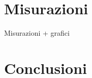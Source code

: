 \documentclass[a4paper,11pt]{book}
\begin{document}
\chapter{Misurazioni}
Misurazioni + grafici
\chapter{Conclusioni}
\end{document}
